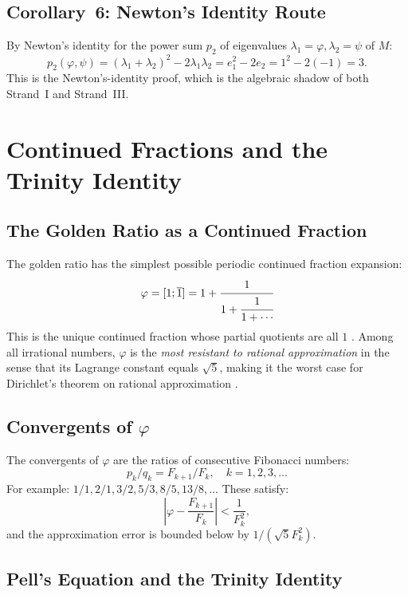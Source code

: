 \subsection{Corollary~6: Newton's Identity Route}

By Newton's identity for the power sum $p_{2}$ of eigenvalues
$\lambda_{1}=\varphi, \lambda_{2}=\psi$ of $M$:
\[
  p_{2}(\varphi,\psi)
  = (\lambda_{1}+\lambda_{2})^{2} - 2\lambda_{1}\lambda_{2}
  = e_{1}^{2} - 2e_{2}
  = 1^{2} - 2(-1)
  = 3.
\]
This is the Newton's-identity proof, which is the algebraic
shadow of both Strand~I and Strand~III.


\section{Continued Fractions and the Trinity Identity}%
\label{sec:continued-fractions}

\subsection{The Golden Ratio as a Continued Fraction}

The golden ratio has the simplest possible periodic continued
fraction expansion:
\[
  \varphi = [1;\overline{1}] = 1 + \cfrac{1}{1+\cfrac{1}{1+\cdots}}
\]
This is the unique continued fraction whose partial quotients
are all $1$ \cite{olds_pell}.
Among all irrational numbers, $\varphi$ is the \emph{most
resistant to rational approximation} in the sense that its
Lagrange constant equals $\sqrt{5}$, making it the worst case
for Dirichlet's theorem on rational approximation \cite{olds_pell}.

\subsection{Convergents of $\varphi$}

The convergents of $\varphi$ are the ratios of consecutive
Fibonacci numbers:
\[
  p_{k}/q_{k} = F_{k+1}/F_{k},\quad k = 1, 2, 3, \ldots
\]
For example: $1/1, 2/1, 3/2, 5/3, 8/5, 13/8, \ldots$
These satisfy:
\[
  \left|\varphi - \frac{F_{k+1}}{F_{k}}\right| < \frac{1}{F_{k}^{2}},
\]
and the approximation error is bounded below by
$1/(\sqrt{5}F_{k}^{2})$.

\subsection{Pell's Equation and the Trinity Identity}

